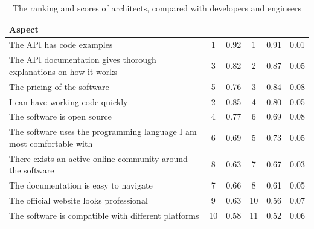 \documentclass{cslthse-msc}
\begin{document}
    \begin{table}[H]
        \centering
        \caption{The ranking and scores of architects, compared with developers and engineers}
        \label{tab:arch-devs}
        \begin{tabularx}{\columnwidth}{X|c:c|c:c|c}

            \textbf{Aspect}                                                    &     & &   & & \\ \hline
            The API has code examples                                             &         1 & 0.92             &               1 & 0.91             & 0.01  \\ \hline
            The API documentation gives thorough explanations on how it works     &         3 & 0.82             &               2 & 0.87             & 0.05  \\ \hline
            The pricing of the software                                           &         5 & 0.76             &               3 & 0.84             & 0.08  \\ \hline
            I can have working code quickly                                       &         2 & 0.85             &               4 & 0.80             & 0.05  \\ \hline
            The software is open source                                           &         4 & 0.77             &               6 & 0.69             & 0.08  \\ \hline
            The software uses the programming language I am most comfortable with &         6 & 0.69             &               5 & 0.73             & 0.05  \\ \hline
            There exists an active online community around the software           &         8 & 0.63             &               7 & 0.67             & 0.03  \\ \hline
            The documentation is easy to navigate                                 &         7 & 0.66             &               8 & 0.61             & 0.05  \\ \hline
            The official website looks professional                               &         9 & 0.63             &              10 & 0.56             & 0.07  \\ \hline
            The software is compatible with different platforms                   &        10 & 0.58             &              11 & 0.52             & 0.06  \\ \hline

\end{tabularx}
\end{table}
\end{document}
